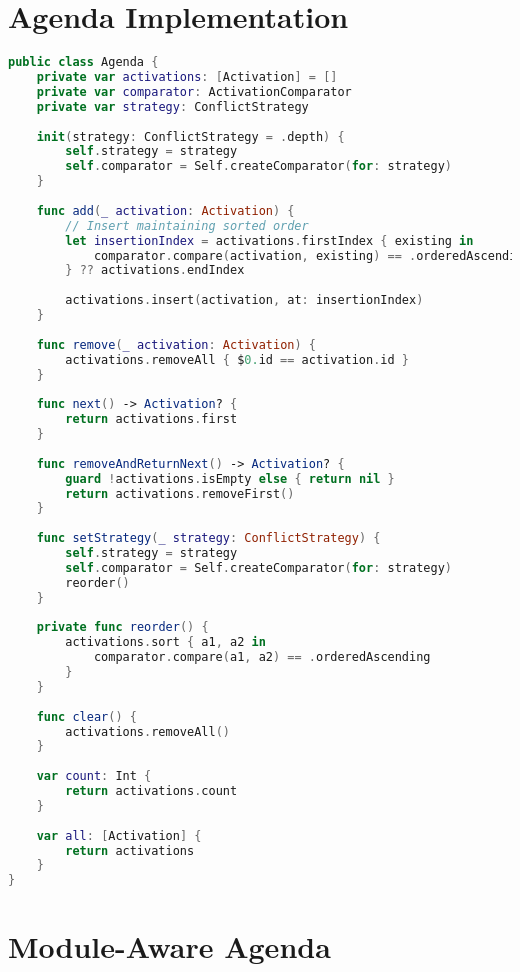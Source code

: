 \section{Agenda Implementation}

\begin{lstlisting}[language=Swift]
public class Agenda {
    private var activations: [Activation] = []
    private var comparator: ActivationComparator
    private var strategy: ConflictStrategy
    
    init(strategy: ConflictStrategy = .depth) {
        self.strategy = strategy
        self.comparator = Self.createComparator(for: strategy)
    }
    
    func add(_ activation: Activation) {
        // Insert maintaining sorted order
        let insertionIndex = activations.firstIndex { existing in
            comparator.compare(activation, existing) == .orderedAscending
        } ?? activations.endIndex
        
        activations.insert(activation, at: insertionIndex)
    }
    
    func remove(_ activation: Activation) {
        activations.removeAll { $0.id == activation.id }
    }
    
    func next() -> Activation? {
        return activations.first
    }
    
    func removeAndReturnNext() -> Activation? {
        guard !activations.isEmpty else { return nil }
        return activations.removeFirst()
    }
    
    func setStrategy(_ strategy: ConflictStrategy) {
        self.strategy = strategy
        self.comparator = Self.createComparator(for: strategy)
        reorder()
    }
    
    private func reorder() {
        activations.sort { a1, a2 in
            comparator.compare(a1, a2) == .orderedAscending
        }
    }
    
    func clear() {
        activations.removeAll()
    }
    
    var count: Int {
        return activations.count
    }
    
    var all: [Activation] {
        return activations
    }
}
\end{lstlisting}

\section{Module-Aware Agenda}

